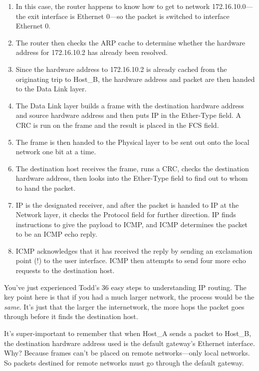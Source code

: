 \begin{enumerate}
  \begin{center}\rule{0.5\linewidth}{0.5pt}\end{center}
\item
  \protect\hypertarget{c09.xhtmlux5cux23Page_366}{}{}In this case, the
  router happens to know how to get to network 172.16.10.0---the exit
  interface is Ethernet 0---so the packet is switched to interface
  Ethernet 0.
\item
  The router then checks the ARP cache to determine whether the hardware
  address for 172.16.10.2 has already been resolved.
\item
  Since the hardware address to 172.16.10.2 is already cached from the
  originating trip to Host\_B, the hardware address and packet are then
  handed to the Data Link layer.
\item
  The Data Link layer builds a frame with the destination hardware
  address and source hardware address and then puts IP in the Ether-Type
  field. A CRC is run on the frame and the result is placed in the FCS
  field.
\item
  The frame is then handed to the Physical layer to be sent out onto the
  local network one bit at a time.
\item
  The destination host receives the frame, runs a CRC, checks the
  destination hardware address, then looks into the Ether-Type field to
  find out to whom to hand the packet.
\item
  IP is the designated receiver, and after the packet is handed to IP at
  the Network layer, it checks the Protocol field for further direction.
  IP finds instructions to give the payload to ICMP, and ICMP determines
  the packet to be an ICMP echo reply.
\item
  ICMP acknowledges that it has received the reply by sending an
  exclamation point (!) to the user interface. ICMP then attempts to
  send four more echo requests to the destination host.
\end{enumerate}

You've just experienced Todd's 36 easy steps to understanding IP
routing. The key point here is that if you had a much larger network,
the process would be the \emph{same}. It's just that the larger the
internetwork, the more hops the packet goes through before it finds the
destination host.

It's super-important to remember that when Host\_A sends a packet to
Host\_B, the destination hardware address used is the default gateway's
Ethernet interface. Why? Because frames can't be placed on remote
networks---only local networks. So packets destined for remote networks
must go through the default gateway.

